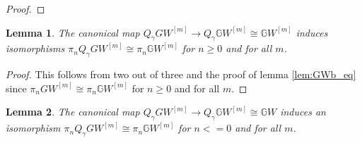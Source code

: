 \documentclass[edeposit,fullpage]{uiucthesis2009}
\newcommand{\mbb}{\mathbb}
\theoremstyle{plain}
\newtheorem{lemma}{Lemma}
\numberwithin{lemma}{section}
\theoremstyle{definition}
\begin{document}
\begin{proof}


\end{proof}



\begin{lemma}\label{lem:pos_htpy}
The canonical map $Q_\gamma GW^{[m]} \rightarrow Q_\gamma \mbb GW^{[m]} \cong \mbb
GW^{[m]}$ induces isomorphisms $\pi_nQ_\gamma GW^{[m]} \cong \pi_n \mbb
GW^{[m]}$ for $n \geq 0$ and for all $m$.
\end{lemma}

\begin{proof}
This follows from two out of three and the proof of lemma \ref{lem:GWb_eq} since $\pi_nGW^{[m]} \cong \pi_n \mbb GW^{[m]}$
for $n \geq 0$ and for all $m$. 
\end{proof}


\begin{lemma}\label{lem:neg_htpy}
The canonical map $Q_\gamma GW^{[m]} \rightarrow Q_\gamma \mbb GW^{[m]} \cong \mbb
GW$ induces an isomorphism $\pi_n Q_\gamma GW^{[m]} \cong \pi_n \mbb
GW^{[m]}$ for $n <= 0$ and for all $m$.
\end{lemma}
\end{document}
